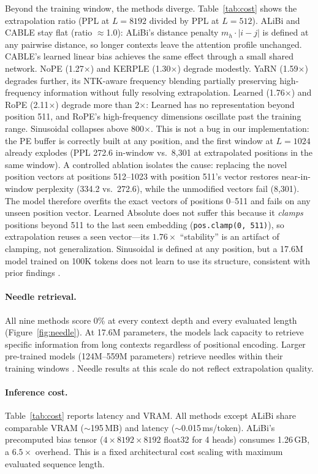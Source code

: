 \documentclass[conference]{IEEEtran}
\begin{document}
Beyond the training window, the methods diverge. Table~\ref{tab:cost} shows the extrapolation ratio (PPL at $L{=}8192$ divided by PPL at $L{=}512$). ALiBi and CABLE stay flat (ratio $\approx$1.0): ALiBi's distance penalty $m_h \cdot |i{-}j|$ is defined at any pairwise distance, so longer contexts leave the attention profile unchanged. CABLE's learned linear bias achieves the same effect through a small shared network. NoPE (1.27$\times$) and KERPLE (1.30$\times$) degrade modestly. YaRN (1.59$\times$) degrades further, its NTK-aware frequency blending partially preserving high-frequency information without fully resolving extrapolation. Learned (1.76$\times$) and RoPE (2.11$\times$) degrade more than 2$\times$: Learned has no representation beyond position 511, and RoPE's high-frequency dimensions oscillate past the training range. Sinusoidal collapses above 800$\times$. This is not a bug in our implementation: the PE buffer is correctly built at any position, and the first window at $L{=}1024$ already explodes (PPL 272.6 in-window vs.\ 8{,}301 at extrapolated positions in the same window). A controlled ablation isolates the cause: replacing the novel position vectors at positions 512--1023 with position 511's vector restores near-in-window perplexity (334.2 vs.\ 272.6), while the unmodified vectors fail (8{,}301). The model therefore overfits the exact vectors of positions 0--511 and fails on any unseen position vector. Learned Absolute does not suffer this because it \emph{clamps} positions beyond 511 to the last seen embedding (\texttt{pos.clamp(0, 511)}), so extrapolation reuses a seen vector---its $1.76\times$ ``stability'' is an artifact of clamping, not generalization. Sinusoidal is defined at any position, but a 17.6M model trained on 100K tokens does not learn to use its structure, consistent with prior findings \cite{press2022,kazemnejad2023}.

\paragraph{Needle retrieval.} All nine methods score 0\% at every context depth and every evaluated length (Figure~\ref{fig:needle}). At 17.6M parameters, the models lack capacity to retrieve specific information from long contexts regardless of positional encoding. Larger pre-trained models (124M--559M parameters) retrieve needles within their training windows \cite{press2022}. Needle results at this scale do not reflect extrapolation quality.

\paragraph{Inference cost.} Table~\ref{tab:cost} reports latency and VRAM. All methods except ALiBi share comparable VRAM ($\sim$195\,MB) and latency ($\sim$0.015\,ms/token). ALiBi's precomputed bias tensor ($4 \times 8192 \times 8192$ float32 for 4 heads) consumes 1.26\,GB, a $6.5\times$ overhead. This is a fixed architectural cost scaling with maximum evaluated sequence length.
\end{document}
